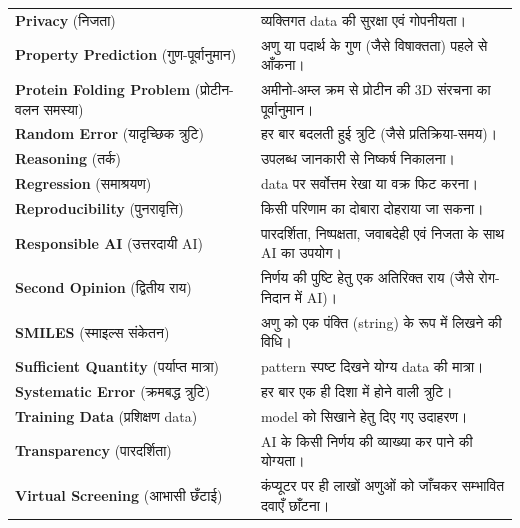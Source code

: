 \begin{longtable}{@{}p{5.2cm} p{8.3cm}@{}}
\textbf{Privacy} (निजता) & व्यक्तिगत data की सुरक्षा एवं गोपनीयता। \\
\textbf{Property Prediction} (गुण-पूर्वानुमान) & अणु या पदार्थ के गुण (जैसे विषाक्तता) पहले से आँकना। \\
\textbf{Protein Folding Problem} (प्रोटीन-वलन समस्या) & अमीनो-अम्ल क्रम से प्रोटीन की 3D संरचना का पूर्वानुमान। \\
\textbf{Random Error} (यादृच्छिक त्रुटि) & हर बार बदलती हुई त्रुटि (जैसे प्रतिक्रिया-समय)। \\
\textbf{Reasoning} (तर्क) & उपलब्ध जानकारी से निष्कर्ष निकालना। \\
\textbf{Regression} (समाश्रयण) & data पर सर्वोत्तम रेखा या वक्र फिट करना। \\
\textbf{Reproducibility} (पुनरावृत्ति) & किसी परिणाम का दोबारा दोहराया जा सकना। \\
\textbf{Responsible AI} (उत्तरदायी AI) & पारदर्शिता, निष्पक्षता, जवाबदेही एवं निजता के साथ AI का उपयोग। \\
\textbf{Second Opinion} (द्वितीय राय) & निर्णय की पुष्टि हेतु एक अतिरिक्त राय (जैसे रोग-निदान में AI)। \\
\textbf{SMILES} (स्माइल्स संकेतन) & अणु को एक पंक्ति (string) के रूप में लिखने की विधि। \\
\textbf{Sufficient Quantity} (पर्याप्त मात्रा) & pattern स्पष्ट दिखने योग्य data की मात्रा। \\
\textbf{Systematic Error} (क्रमबद्ध त्रुटि) & हर बार एक ही दिशा में होने वाली त्रुटि। \\
\textbf{Training Data} (प्रशिक्षण data) & model को सिखाने हेतु दिए गए उदाहरण। \\
\textbf{Transparency} (पारदर्शिता) & AI के किसी निर्णय की व्याख्या कर पाने की योग्यता। \\
\textbf{Virtual Screening} (आभासी छँटाई) & कंप्यूटर पर ही लाखों अणुओं को जाँचकर सम्भावित दवाएँ छाँटना। \\
\end{longtable}
